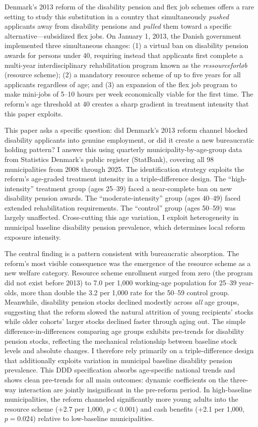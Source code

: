\documentclass[12pt]{article}
\begin{document}
Denmark's 2013 reform of the disability pension and flex job schemes offers a rare setting to study this substitution in a country that simultaneously \textit{pushed} applicants away from disability pensions and \textit{pulled} them toward a specific alternative---subsidized flex jobs. On January 1, 2013, the Danish government implemented three simultaneous changes: (1) a virtual ban on disability pension awards for persons under 40, requiring instead that applicants first complete a multi-year interdisciplinary rehabilitation program known as the \textit{ressourceforl\o{}b} (resource scheme); (2) a mandatory resource scheme of up to five years for all applicants regardless of age; and (3) an expansion of the flex job program to make mini-jobs of 5--10 hours per week economically viable for the first time. The reform's age threshold at 40 creates a sharp gradient in treatment intensity that this paper exploits.

This paper asks a specific question: did Denmark's 2013 reform channel blocked disability applicants into genuine employment, or did it create a new bureaucratic holding pattern? I answer this using quarterly municipality-by-age-group data from Statistics Denmark's public register (StatBank), covering all 98 municipalities from 2008 through 2025. The identification strategy exploits the reform's age-graded treatment intensity in a triple-difference design. The ``high-intensity'' treatment group (ages 25--39) faced a near-complete ban on new disability pension awards. The ``moderate-intensity'' group (ages 40--49) faced extended rehabilitation requirements. The ``control'' group (ages 50--59) was largely unaffected. Cross-cutting this age variation, I exploit heterogeneity in municipal baseline disability pension prevalence, which determines local reform exposure intensity.

The central finding is a pattern consistent with bureaucratic absorption. The reform's most visible consequence was the emergence of the resource scheme as a new welfare category. Resource scheme enrollment surged from zero (the program did not exist before 2013) to 7.0 per 1,000 working-age population for 25--39 year-olds, more than double the 3.2 per 1,000 rate for the 50--59 control group. Meanwhile, disability pension stocks declined modestly across \textit{all} age groups, suggesting that the reform slowed the natural attrition of young recipients' stocks while older cohorts' larger stocks declined faster through aging out. The simple difference-in-differences comparing age groups exhibits pre-trends for disability pension stocks, reflecting the mechanical relationship between baseline stock levels and absolute changes. I therefore rely primarily on a triple-difference design that additionally exploits variation in municipal baseline disability pension prevalence. This DDD specification absorbs age-specific national trends and shows clean pre-trends for all main outcomes: dynamic coefficients on the three-way interaction are jointly insignificant in the pre-reform period. In high-baseline municipalities, the reform channeled significantly more young adults into the resource scheme (+2.7 per 1,000, $p < 0.001$) and cash benefits (+2.1 per 1,000, $p = 0.024$) relative to low-baseline municipalities.
\end{document}
